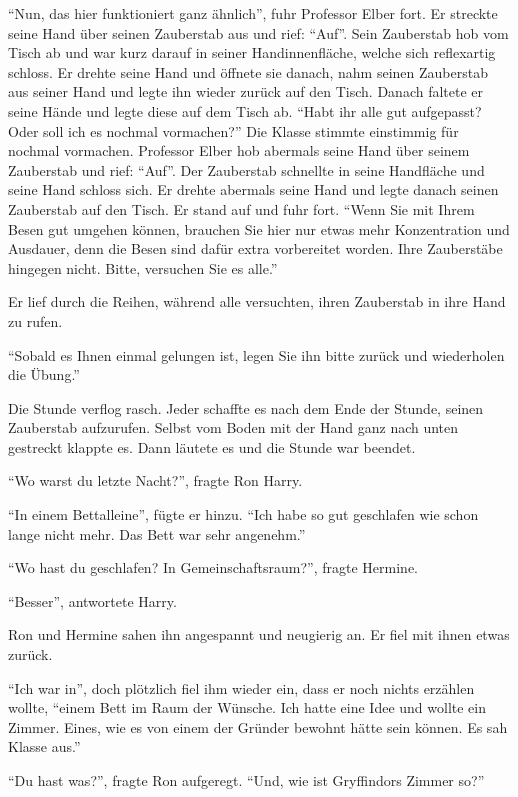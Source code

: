 \enquote{Nun, das hier funktioniert ganz ähnlich}, fuhr Professor Elber fort. Er streckte seine Hand über seinen Zauberstab aus und rief: \enquote{Auf}. Sein Zauberstab hob vom Tisch ab und war kurz darauf in seiner Handinnenfläche, welche sich reflexartig schloss. Er drehte seine Hand und öffnete sie danach, nahm seinen Zauberstab aus seiner Hand und legte ihn wieder zurück auf den Tisch. Danach faltete er seine Hände und legte diese auf dem Tisch ab. \enquote{Habt ihr alle gut aufgepasst? Oder soll ich es nochmal vormachen?} Die Klasse stimmte einstimmig für nochmal vormachen. Professor Elber hob abermals seine Hand über seinem Zauberstab und rief: \enquote{Auf}. Der Zauberstab schnellte in seine Handfläche und seine Hand schloss sich. Er drehte abermals seine Hand und legte danach seinen Zauberstab auf den Tisch. Er stand auf und fuhr fort. \enquote{Wenn Sie mit Ihrem Besen gut umgehen können, brauchen Sie hier nur etwas mehr Konzentration und Ausdauer, denn die Besen sind dafür extra vorbereitet worden. Ihre Zauberstäbe hingegen nicht. Bitte, versuchen Sie es alle.}

Er lief durch die Reihen, während alle versuchten, ihren Zauberstab in ihre Hand zu rufen.

\enquote{Sobald es Ihnen einmal gelungen ist, legen Sie ihn bitte zurück und wiederholen die Übung.}

Die Stunde verflog rasch. Jeder schaffte es nach dem Ende der Stunde, seinen Zauberstab aufzurufen. Selbst vom Boden mit der Hand ganz nach unten gestreckt klappte es. Dann läutete es und die Stunde war beendet.

\enquote{Wo warst du letzte Nacht?}, fragte Ron Harry.

\enquote{In einem Bett\abs alleine}, fügte er hinzu. \enquote{Ich habe so gut geschlafen wie schon lange nicht mehr. Das Bett war sehr angenehm.}

\enquote{Wo hast du geschlafen? In  Gemeinschaftsraum?}, fragte Hermine.

\enquote{Besser}, antwortete Harry.

Ron und Hermine sahen ihn angespannt und neugierig an. Er fiel mit ihnen etwas zurück.

\enquote{Ich war in}, doch plötzlich fiel ihm wieder ein, dass er noch nichts erzählen wollte, \enquote{einem Bett im Raum der Wünsche. Ich hatte eine Idee und wollte ein Zimmer. Eines, wie es von einem der Gründer bewohnt hätte sein können. Es sah Klasse aus.}

\enquote{Du hast was?}, fragte Ron aufgeregt. \enquote{Und, wie ist Gryffindors Zimmer so?}

